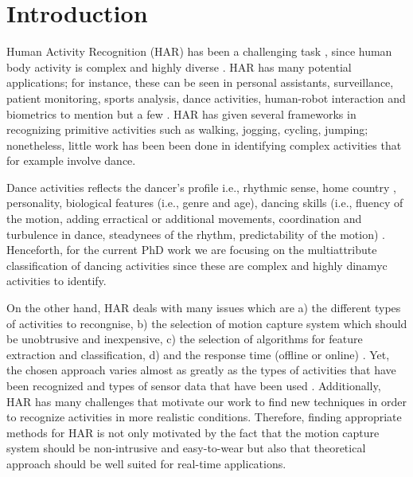 
\chapter{Introduction}  %

\ifpdf
    \graphicspath{{Chapter1/Figs/Raster/}{Chapter1/Figs/PDF/}{Chapter1/Figs/}}
\else
    \graphicspath{{Chapter1/Figs/Vector/}{Chapter1/Figs/}}
\fi

Human Activity Recognition (HAR) has been a challenging task \cite{Aggarwal2004}, 
since human body activity is complex and highly diverse \cite{Kim2010}.
HAR has many potential applications; for instance, these can be seen in personal 
assistants, surveillance, patient monitoring, sports analysis, dance activities, 
human-robot interaction and biometrics to mention but a few \cite{Aggarwal2011}. 
HAR has given several frameworks in recognizing primitive activities 
such as walking, jogging, cycling, jumping; nonetheless, little work has been been
done in identifying complex activities that for example involve dance. 

Dance activities reflects the dancer's profile i.e., rhythmic sense, 
home country \cite{Iwai2011}, personality, biological features (i.e., genre and age),
dancing skills (i.e., fluency of the motion, adding erractical or additional movements,
coordination and turbulence in dance, steadynees of the rhythm, predictability of 
the motion) \cite{GrammerK.ElisabethOberzaucher2011}.
Henceforth, for the current PhD work
we are focusing on the multiattribute classification of dancing activities 
since these are complex and  highly dinamyc activities to identify.

On the other hand, HAR deals with many issues which are
a) the different types of activities to recongnise,
b) the selection of motion capture system which should be unobtrusive and inexpensive,
c) the selection of algorithms for feature extraction and classification,
d) and the response time (offline or online) \cite{Lara2013}.
Yet, the chosen approach varies almost as greatly as the types of activities 
that have been recognized and types of sensor data that have been used 
\cite{Kim2010}. Additionally, HAR has many challenges that motivate our work 
to find new techniques in order to recognize activities in more realistic conditions. 
Therefore, finding appropriate methods for HAR is not only motivated by the 
fact that the motion capture system should be non-intrusive and easy-to-wear
but also that theoretical approach should be well suited for real-time applications.

